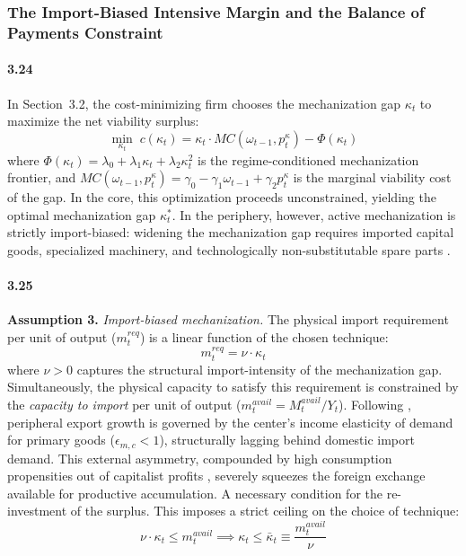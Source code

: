 \subsubsection{The Import-Biased Intensive Margin and the
	Balance of Payments Constraint}

\paragraph{3.24}
In Section~3.2, the cost-minimizing firm chooses the
mechanization gap $\kappa_t$ to maximize the net viability
surplus:
\begin{equation}
	\min_{\kappa_t}\; c(\kappa_t)
	= \kappa_t \cdot MC(\omega_{t-1}, p^\kappa_t) - \Phi(\kappa_t)
	\label{eq:33:objective_periphery}
\end{equation}
where $\Phi(\kappa_t) = \lambda_0 + \lambda_1 \kappa_t
+ \lambda_2 \kappa_t^2$ is the regime-conditioned
mechanization frontier, and $MC(\omega_{t-1}, p^\kappa_t)
= \gamma_0 - \gamma_1 \omega_{t-1} + \gamma_2 p^\kappa_t$
is the marginal viability cost of the gap. In the core, this
optimization proceeds unconstrained, yielding the optimal
mechanization gap $\kappa_t^*$. In the periphery, however,
active mechanization is strictly import-biased: widening the
mechanization gap requires imported capital goods, specialized
machinery, and technologically non-substitutable spare parts \citep{Vernengo2006}.

\paragraph{3.25}
\textbf{Assumption 3.} \textit{Import-biased mechanization.}
The physical import requirement per unit of output
($m^{req}_t$) is a linear function of the chosen technique:
\begin{equation}
	m^{req}_t = \nu \cdot \kappa_t
	\label{eq:33:import_req}
\end{equation}
where $\nu > 0$ captures the structural import-intensity of
the mechanization gap. Simultaneously, the physical capacity
to satisfy this requirement is constrained by the 
\textit{capacity to import} per unit of output
($m^{avail}_t = M^{avail}_t / Y_t$). Following
\citet{Prebisch1981}, peripheral export growth is governed by
the center's income elasticity of demand for primary goods
($\epsilon_{m,c} < 1$), structurally lagging behind domestic
import demand. This external asymmetry, compounded by high
consumption propensities out of capitalist profits
\citep{Kaldor1959}, severely squeezes the foreign exchange
available for productive accumulation. A necessary condition for the re-investment of the surplus. This imposes a strict
ceiling on the choice of technique: 
\begin{equation}
	\nu \cdot \kappa_t \le m^{avail}_t
	\implies \kappa_t \le \bar{\kappa}_t
	\equiv \frac{m^{avail}_t}{\nu}
	\label{eq:33:bop_ceiling}
\end{equation}

